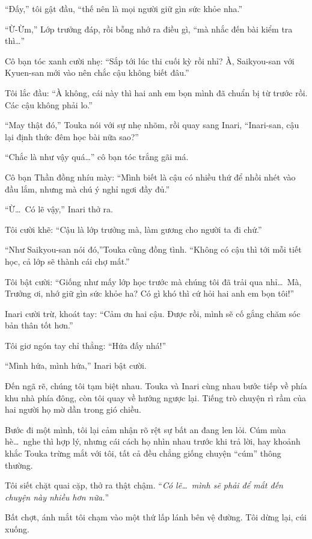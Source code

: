 \documentclass[../main.tex]{subfiles}
\begin{document}
``Đấy,'' tôi gật đầu, ``thế nên là mọi người giữ gìn sức khỏe nha.''

``Ừ-Ừm,'' Lớp trưởng đáp, rồi bỗng nhớ ra điều gì, ``mà nhắc đến bài kiểm tra thì\dots''

Cô bạn tóc xanh cười nhẹ: ``Sắp tới lúc thi cuối kỳ rồi nhỉ? À, Saikyou-san với Kyuen-san mới vào nên chắc cậu không biết đâu.''

Tôi lắc đầu: ``À không, cái này thì hai anh em bọn mình đã chuẩn bị từ trước rồi. Các cậu không phải lo.''

``May thật đó,'' Touka nói với sự nhẹ nhõm, rồi quay sang Inari, ``Inari-san, cậu lại định thức đêm học bài nữa sao?''

``Chắc là như vậy quá\dots'' cô bạn tóc trắng gãi má.

Cô bạn Thần đồng nhíu mày: ``Mình biết là cậu có nhiều thứ để nhồi nhét vào đầu lắm, nhưng mà chú ý nghỉ ngơi đầy đủ.''

``Ừ\dots\ Có lẽ vậy,'' Inari thở ra.

Tôi cười khẽ: ``Cậu là lớp trưởng mà, làm gương cho người ta đi chứ.''

``Như Saikyou-san nói đó,''Touka cũng đồng tình. ``Không có cậu thì tới mỗi tiết học, cả lớp sẽ thành cái chợ mất.''

Tôi bật cười: ``Giống như mấy lớp học trước mà chúng tôi đã trải qua nhỉ\dots\ Mà, Trưởng ơi, nhớ giữ gìn sức khỏe ha? Có gì khó thì cứ hỏi hai anh em bọn tôi!''

Inari cười trừ, khoát tay: ``Cảm ơn hai cậu. Được rồi, mình sẽ cố gắng chăm sóc bản thân tốt hơn.''

Tôi giơ ngón tay chỉ thẳng: ``Hứa đấy nhá!''

``Mình hứa, mình hứa,'' Inari bật cười.

\ct

Đến ngã rẽ, chúng tôi tạm biệt nhau. Touka và Inari cùng nhau bước tiếp về phía khu nhà phía đông, còn tôi quay về hướng ngược lại. Tiếng trò chuyện rì rầm của hai người họ mờ dần trong gió chiều.

Bước đi một mình, tôi lại cảm nhận rõ rệt sự bất an đang len lỏi. Cúm mùa hè\dots\ nghe thì hợp lý, nhưng cái cách họ nhìn nhau trước khi trả lời, hay khoảnh khắc Touka trừng mắt với tôi, tất cả đều chẳng giống chuyện ``cúm'' thông thường.

Tôi siết chặt quai cặp, thở ra thật chậm.
``\textit{Có lẽ\dots\ mình sẽ phải để mắt đến chuyện này nhiều hơn nữa.}''

Bất chợt, ánh mắt tôi chạm vào một thứ lấp lánh bên vệ đường. Tôi dừng lại, cúi xuống.
\end{document}
